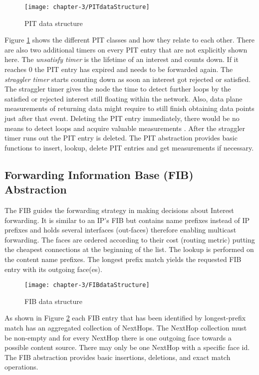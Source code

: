 \begin{figure}[H]
  \centering
  \texttt{[image: chapter-3/PITdataStructure]}
  \caption{PIT data structure \cite{Afanasyev16}}
  \label{fig:PITdataStructure}
\end{figure}

Figure \ref{fig:PITdataStructure} shows the different PIT classes and how they relate to each other. There are also two additional timers on every PIT entry that are not explicitly shown here. The \emph{unsatisfy timer} is the lifetime of an interest and counts down. If it reaches 0 the PIT entry has expired and needs to be forwarded again. The \emph{straggler timer} starts counting down as soon an interest got rejected or satisfied. The straggler timer gives the node the time to detect further loops by the satisfied or rejected interest still floating within the network. Also, data plane measurements of returning data might require to still finish obtaining data points just after that event. Deleting the PIT entry immediately, there would be no means to detect loops and acquire valuable measurements \cite{Afanasyev16}. After the straggler timer runs out the PIT entry is deleted. The PIT abstraction provides basic functions to insert, lookup, delete PIT entries and get measurements if necessary.

\newpage

\subsection{Forwarding Information Base (FIB) Abstraction}

The FIB guides the forwarding strategy in making decisions about Interest forwarding. It is similar to an IP's FIB but contains name prefixes instead of IP prefixes and holds several interfaces (out-faces) therefore enabling multicast forwarding. The faces are ordered according to their cost (routing metric) putting the cheapest connections at the beginning of the list. The lookup is performed on the content name prefixes. The longest prefix match yields the requested FIB entry with its outgoing face(es).

\begin{figure}[H]
  \centering
  \texttt{[image: chapter-3/FIBdataStructure]}
  \caption{FIB data structure \cite{Afanasyev16}}
  \label{fig:FIBdataStructure}
\end{figure}

As shown in Figure \ref{fig:FIBdataStructure} each FIB entry that has been identified by longest-prefix match has an aggregated collection of NextHops. The NextHop collection must be non-empty and for every NextHop there is one outgoing face towards a possible content source. There may only be one NextHop with a specific face id. The FIB abstraction provides basic insertions, deletions, and exact match operations.


